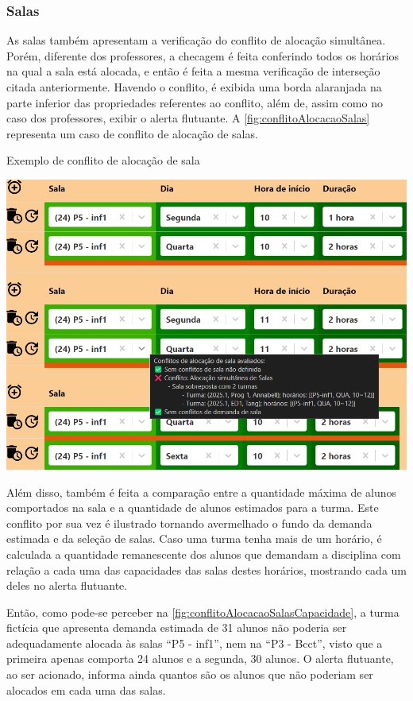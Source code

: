 \subsubsection{Salas}

As salas também apresentam a verificação do conflito de alocação simultânea. Porém, diferente dos professores, a checagem é feita conferindo todos os horários na qual a sala está alocada, e então é feita a mesma verificação de interseção citada anteriormente. Havendo o conflito, é exibida uma borda alaranjada na parte inferior das propriedades referentes ao conflito, além de, assim como no caso dos professores, exibir o alerta flutuante. A \autoref{fig:conflitoAlocacaoSalas} representa um caso de conflito de alocação de salas.

\begin{MyCenteredFigure}
  \caption{Exemplo de conflito de alocação de sala}
  \label{fig:conflitoAlocacaoSalas}
  \includegraphics[width=\textwidth]{files/img/2.02!5-desenvolvimento/2.02!5.1.5-conflitos/Alocação de Salas - Sala}
\end{MyCenteredFigure}

Além disso, também é feita a comparação entre a quantidade máxima de alunos comportados na sala e a quantidade de alunos estimados para a turma. Este conflito por sua vez é ilustrado tornando avermelhado o fundo da demanda estimada e da seleção de salas. Caso uma turma tenha mais de um horário, é calculada a quantidade remanescente dos alunos que demandam a disciplina com relação a cada uma das capacidades das salas destes horários, mostrando cada um deles no alerta flutuante.

Então, como pode-se perceber na \autoref{fig:conflitoAlocacaoSalasCapacidade}, a turma fictícia que apresenta demanda estimada de 31 alunos não poderia ser adequadamente alocada às salas ``P5 - inf1'', nem na ``P3 - Bcct'', visto que a primeira apenas comporta 24 alunos e a segunda, 30 alunos. O alerta flutuante, ao ser acionado, informa ainda quantos são os alunos que não poderiam ser alocados em cada uma das salas.

